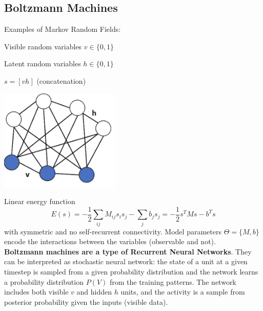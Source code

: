 \documentclass[10pt]{report}
\begin{document}
\subsection{Boltzmann Machines}
Examples of Markov Random Fields:
\begin{multicols}{2}
\begin{list}{}{}
	\item Visible random variables $v\in\{0,1\}$
	\item Latent random variables $h\in\{0,1\}$
	\item $s = [vh]$ (concatenation)
\end{list}
\columnbreak
\begin{center}
	\includegraphics[scale=0.5]{46.png}
\end{center}
\end{multicols}
Linear energy function $$E(s) = -\frac{1}{2}\sum_{ij}M_{ij}s_is_j - \sum_jb_js_j = -\frac{1}{2}s^TMs - b^Ts$$
with symmetric and no self-recurrent connectivity. Model parameters $\Theta = \{M, b\}$ encode the interactions between the variables (observable and not).\\
\textbf{Boltzmann machines are a type of Recurrent Neural Networks}. They can be interpreted as stochastic neural network: the state of a unit at a given timestep is sampled from a given probability distribution and the network learns a probability distribution $P(V)$ from the training patterns. The network includes both visible $v$ and hidden $h$ units, and the activity is a sample from posterior probability given the inputs (visible data).
\end{document}
